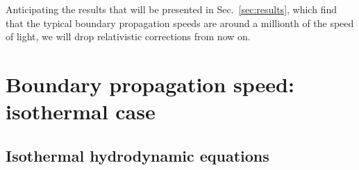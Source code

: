 \documentclass[10pt,superscriptaddress,
amsmath,aps,prc,twocolumn,nofootinbib,floatfix]{revtex4-1}
\newcommand{\mga}[1]{{\color[rgb]{0.6,0,0}#1}}
\newcommand{\mgacom}[1]{\textsf{\color[rgb]{0.8,0,0}[\textsuperscript{MGA} #1]}}
\newcommand{\JS}[1]{{\color{violet}#1}}
\newcommand{\JScom}[1]{\textsf{\color{violet} [\textsuperscript{JS}#1]}}
\newcommand{\ga}{\gamma}
\newcommand{\eps}{\epsilon}
\begin{document}
\mga{
Anticipating the results that will be presented in Sec.~\ref{sec:results}, which find that the typical boundary propagation speeds are
around a millionth of the speed of light, we will drop relativistic corrections from now on.}

\section{Boundary propagation speed: isothermal case}
\label{sec:speed-isothermal}


\subsection{Isothermal hydrodynamic equations}
\label{sec:isothermal-equations}

\end{document}
